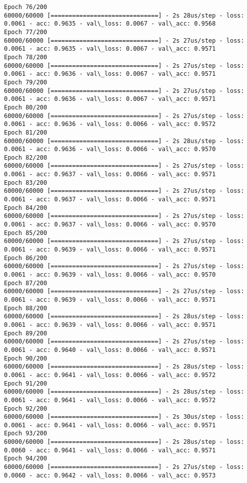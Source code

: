 \documentclass[11pt]{article}
\begin{document}
\begin{Verbatim}[commandchars=\\\{\}]
Epoch 76/200
60000/60000 [==============================] - 2s 28us/step - loss: 0.0061 - acc: 0.9635 - val\_loss: 0.0067 - val\_acc: 0.9568
Epoch 77/200
60000/60000 [==============================] - 2s 27us/step - loss: 0.0061 - acc: 0.9635 - val\_loss: 0.0067 - val\_acc: 0.9571
Epoch 78/200
60000/60000 [==============================] - 2s 27us/step - loss: 0.0061 - acc: 0.9636 - val\_loss: 0.0067 - val\_acc: 0.9571
Epoch 79/200
60000/60000 [==============================] - 2s 27us/step - loss: 0.0061 - acc: 0.9636 - val\_loss: 0.0067 - val\_acc: 0.9571
Epoch 80/200
60000/60000 [==============================] - 2s 27us/step - loss: 0.0061 - acc: 0.9636 - val\_loss: 0.0066 - val\_acc: 0.9572
Epoch 81/200
60000/60000 [==============================] - 2s 28us/step - loss: 0.0061 - acc: 0.9636 - val\_loss: 0.0066 - val\_acc: 0.9570
Epoch 82/200
60000/60000 [==============================] - 2s 27us/step - loss: 0.0061 - acc: 0.9637 - val\_loss: 0.0066 - val\_acc: 0.9571
Epoch 83/200
60000/60000 [==============================] - 2s 27us/step - loss: 0.0061 - acc: 0.9637 - val\_loss: 0.0066 - val\_acc: 0.9571
Epoch 84/200
60000/60000 [==============================] - 2s 27us/step - loss: 0.0061 - acc: 0.9637 - val\_loss: 0.0066 - val\_acc: 0.9570
Epoch 85/200
60000/60000 [==============================] - 2s 27us/step - loss: 0.0061 - acc: 0.9639 - val\_loss: 0.0066 - val\_acc: 0.9571
Epoch 86/200
60000/60000 [==============================] - 2s 27us/step - loss: 0.0061 - acc: 0.9639 - val\_loss: 0.0066 - val\_acc: 0.9570
Epoch 87/200
60000/60000 [==============================] - 2s 27us/step - loss: 0.0061 - acc: 0.9639 - val\_loss: 0.0066 - val\_acc: 0.9571
Epoch 88/200
60000/60000 [==============================] - 2s 28us/step - loss: 0.0061 - acc: 0.9639 - val\_loss: 0.0066 - val\_acc: 0.9571
Epoch 89/200
60000/60000 [==============================] - 2s 27us/step - loss: 0.0061 - acc: 0.9640 - val\_loss: 0.0066 - val\_acc: 0.9571
Epoch 90/200
60000/60000 [==============================] - 2s 28us/step - loss: 0.0061 - acc: 0.9641 - val\_loss: 0.0066 - val\_acc: 0.9572
Epoch 91/200
60000/60000 [==============================] - 2s 28us/step - loss: 0.0061 - acc: 0.9641 - val\_loss: 0.0066 - val\_acc: 0.9572
Epoch 92/200
60000/60000 [==============================] - 2s 30us/step - loss: 0.0061 - acc: 0.9641 - val\_loss: 0.0066 - val\_acc: 0.9571
Epoch 93/200
60000/60000 [==============================] - 2s 28us/step - loss: 0.0060 - acc: 0.9641 - val\_loss: 0.0066 - val\_acc: 0.9571
Epoch 94/200
60000/60000 [==============================] - 2s 27us/step - loss: 0.0060 - acc: 0.9642 - val\_loss: 0.0066 - val\_acc: 0.9573

\end{Verbatim}
\end{document}
